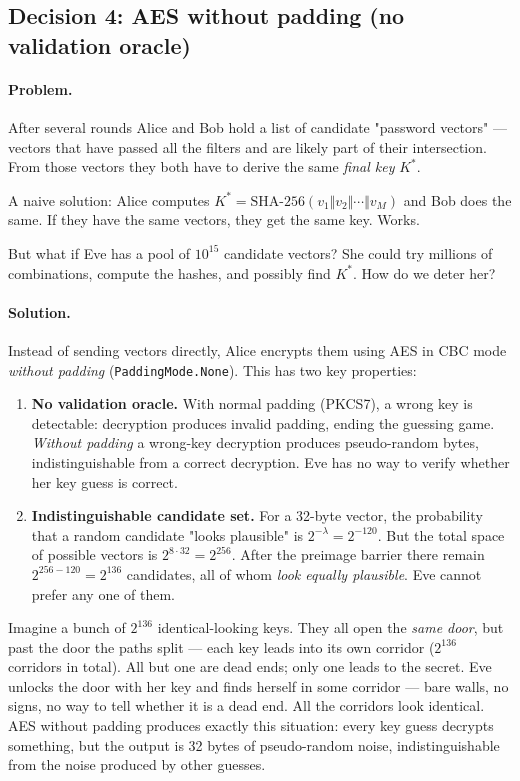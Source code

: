 \documentclass[11pt,a4paper]{article}
\begin{document}
\subsection{Decision 4: AES without padding (no validation oracle)}\label{pop:design-aes}

\paragraph{Problem.} After several rounds Alice and Bob hold a list of candidate "password vectors" --- vectors that have passed all the filters and are likely part of their intersection. From those vectors they both have to derive the same \emph{final key} $K^*$.

A naive solution: Alice computes $K^* = \text{SHA-256}(v_1 \Vert v_2 \Vert \cdots \Vert v_M)$ and Bob does the same. If they have the same vectors, they get the same key. Works.

But what if Eve has a pool of $10^{15}$ candidate vectors? She could try millions of combinations, compute the hashes, and possibly find $K^*$. How do we deter her?

\paragraph{Solution.} Instead of sending vectors directly, Alice encrypts them using AES in CBC mode \emph{without padding} (\texttt{PaddingMode.None}). This has two key properties:

\begin{enumerate}[leftmargin=*]
\item \textbf{No validation oracle.} With normal padding (PKCS7), a wrong key is detectable: decryption produces invalid padding, ending the guessing game. \emph{Without padding} a wrong-key decryption produces pseudo-random bytes, indistinguishable from a correct decryption. Eve has no way to verify whether her key guess is correct.
\item \textbf{Indistinguishable candidate set.} For a 32-byte vector, the probability that a random candidate "looks plausible" is $2^{-\lambda} = 2^{-120}$. But the total space of possible vectors is $2^{8 \cdot 32} = 2^{256}$. After the preimage barrier there remain $2^{256-120} = 2^{136}$ candidates, all of whom \emph{look equally plausible}. Eve cannot prefer any one of them.
\end{enumerate}

\begin{aha}
Imagine a bunch of $2^{136}$ identical-looking keys. They all open the \emph{same door}, but past the door the paths split --- each key leads into its own corridor ($2^{136}$ corridors in total). All but one are dead ends; only one leads to the secret. Eve unlocks the door with her key and finds herself in some corridor --- bare walls, no signs, no way to tell whether it is a dead end. All the corridors look identical. AES without padding produces exactly this situation: every key guess decrypts something, but the output is 32 bytes of pseudo-random noise, indistinguishable from the noise produced by other guesses.
\end{aha}
\end{document}
